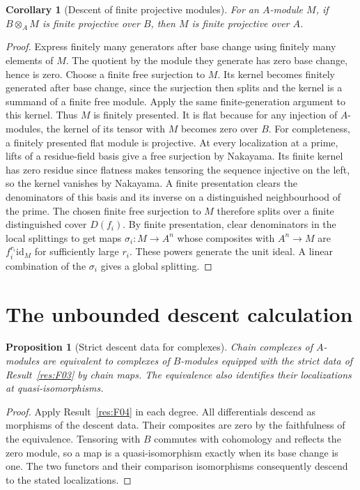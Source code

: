 \documentclass[11pt,oneside,openany]{book}
\newtheorem{proposition}[theorem]{Proposition}
\newtheorem{corollary}[theorem]{Corollary}
\theoremstyle{definition}
\theoremstyle{remark}
\begin{document}
\begin{corollary}[Descent of finite projective modules]\label{res:F05}
For an \(A\)-module \(M\), if \(B\otimes_A M\) is finite projective
over \(B\), then \(M\) is finite projective over \(A\).
\end{corollary}
\begin{proof}
Express finitely many generators after base change using finitely many
elements of \(M\). The quotient by the module they generate has zero
base change, hence is zero. Choose a finite free surjection to \(M\).
Its kernel becomes finitely generated after base change, since the
surjection then splits and the kernel is a summand of a finite free
module. Apply the same finite-generation argument to this kernel.
Thus \(M\) is finitely presented.
It is flat because for any injection of \(A\)-modules, the kernel of
its tensor with \(M\) becomes zero over \(B\).
For completeness, a finitely presented flat module is projective.
At every localization at a prime, lifts of a residue-field basis
give a free surjection by Nakayama. Its finite kernel has zero
residue since flatness makes tensoring the sequence injective on
the left, so the kernel vanishes by Nakayama. A finite presentation
clears the denominators of this basis and its inverse on a
distinguished neighbourhood of the prime. The chosen finite free
surjection to \(M\) therefore splits over a finite distinguished
cover \(D(f_i)\). By finite presentation, clear denominators in the
local splittings to get maps \(\sigma_i:M\to A^n\) whose composites
with \(A^n\to M\) are \(f_i^{r_i}\mathrm{id}_M\) for sufficiently
large \(r_i\). These powers generate the unit ideal. A linear
combination of the \(\sigma_i\) gives a global splitting.
\end{proof}

\section{The unbounded descent calculation}

\begin{proposition}[Strict descent data for complexes]\label{res:F06}
Chain complexes of \(A\)-modules are equivalent to complexes of
\(B\)-modules equipped with the strict data of Result~\ref{res:F03}
by chain maps. The equivalence also identifies their localizations
at quasi-isomorphisms.
\end{proposition}
\begin{proof}
Apply Result~\ref{res:F04} in each degree. All differentials descend
as morphisms of the descent data. Their composites are zero by the
faithfulness of the equivalence. Tensoring with \(B\) commutes with
cohomology and reflects the zero module, so a map is a
quasi-isomorphism exactly when its base change is one.
The two functors and their comparison isomorphisms consequently
descend to the stated localizations.
\end{proof}
\end{document}
